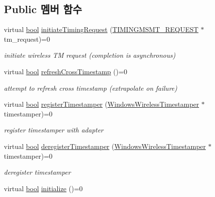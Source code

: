 \subsection*{Public 멤버 함수}
\begin{DoxyCompactItemize}
\item 
virtual \hyperlink{avb__gptp_8h_af6a258d8f3ee5206d682d799316314b1}{bool} \hyperlink{class_windows_wireless_adapter_a87c023acaa8f59c76b3487fc10a3242a}{initiate\+Timing\+Request} (\hyperlink{wireless__tstamper_8hpp_a5830b5c9301af6c6ba8f730db5a4b571}{T\+I\+M\+I\+N\+G\+M\+S\+M\+T\+\_\+\+R\+E\+Q\+U\+E\+ST} $\ast$tm\+\_\+request)=0
\begin{DoxyCompactList}\small\item\em initiate wireless TM request (completion is asynchronous) \end{DoxyCompactList}\item 
virtual \hyperlink{avb__gptp_8h_af6a258d8f3ee5206d682d799316314b1}{bool} \hyperlink{class_windows_wireless_adapter_a0e1802a392dab2c9d5712a11331b0e93}{refresh\+Cross\+Timestamp} ()=0
\begin{DoxyCompactList}\small\item\em attempt to refresh cross timestamp (extrapolate on failure) \end{DoxyCompactList}\item 
virtual \hyperlink{avb__gptp_8h_af6a258d8f3ee5206d682d799316314b1}{bool} \hyperlink{class_windows_wireless_adapter_a27d5a0c324523bc40b8a7f5624b8cd57}{register\+Timestamper} (\hyperlink{class_windows_wireless_timestamper}{Windows\+Wireless\+Timestamper} $\ast$timestamper)=0
\begin{DoxyCompactList}\small\item\em register timestamper with adapter \end{DoxyCompactList}\item 
virtual \hyperlink{avb__gptp_8h_af6a258d8f3ee5206d682d799316314b1}{bool} \hyperlink{class_windows_wireless_adapter_aa8e6a4b328854b94c9c89356b545c142}{deregister\+Timestamper} (\hyperlink{class_windows_wireless_timestamper}{Windows\+Wireless\+Timestamper} $\ast$timestamper)=0
\begin{DoxyCompactList}\small\item\em deregister timestamper \end{DoxyCompactList}\item 
virtual \hyperlink{avb__gptp_8h_af6a258d8f3ee5206d682d799316314b1}{bool} \hyperlink{class_windows_wireless_adapter_a34baaf337a8602c543e260ca190e11a6}{initialize} ()=0

\end{DoxyCompactItemize}
